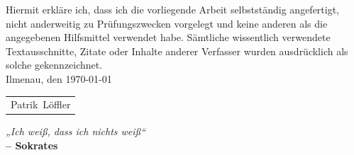 Hiermit erkläre ich, dass ich die vorliegende Arbeit
selbstständig angefertigt, nicht anderweitig zu Prüfungszwecken vorgelegt und
keine anderen als die angegebenen Hilfsmittel verwendet habe. Sämtliche 
wissentlich verwendete Textausschnitte, Zitate oder Inhalte anderer Verfasser 
wurden ausdrücklich als solche gekennzeichnet.\\[2ex]
Ilmenau, den \today\\[6ex]
\newlength\us
\settowidth{\us}{-Patrik~Löffler-}
\begin{tabular}{p{\us}}\hline
\centering\footnotesize Patrik~Löffler
\end{tabular}

\newpage
\cleardoublepage
\thispagestyle{empty}
\vspace*{\fill} 

\begin{center}
\textit{„Ich weiß, dass ich nichts weiß“} \\
\textbf{– Sokrates}
\end{center}

\vspace*{\fill} 

\newpage
